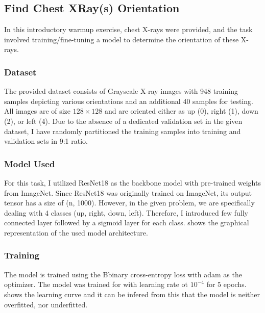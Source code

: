 \subsection{Find Chest XRay(s) Orientation}
\label{sec:warmup2}

    In this introductory warmup exercise, chest X-rays were provided, and the task involved training/fine-tuning a model to determine the orientation of these X-rays.

\subsubsection{Dataset}
    The provided dataset consists of Grayscale X-ray images with 948 training samples depicting various orientations and an additional 40 samples for testing. All images are of size $128 \times 128$ and are oriented either as up (0), right (1), down (2), or left (4). Due to the absence of a dedicated validation set in the given dataset, I have randomly partitioned the training samples into training and validation sets in 9:1 ratio. 
\subsubsection{Model Used}

    For this task, I utilized ResNet18 as the backbone model with pre-trained weights from ImageNet. Since ResNet18 was originally trained on ImageNet, its output tensor has a size of (n, 1000). However, in the given problem, we are specifically dealing with 4 classes (up, right, down, left). Therefore, I introduced few fully connected layer followed by a sigmoid layer for each class.  shows the graphical representation of the used model architecture.
    

\subsubsection{Training}
    
    The model is trained using the Bbinary cross-entropy loss with adam as the optimizer. The model was trained for with learning rate ot $10^{-4}$ for $5$ epochs.  shows the learning curve and it can be infered from this that the model is neither overfitted, nor underfitted.

